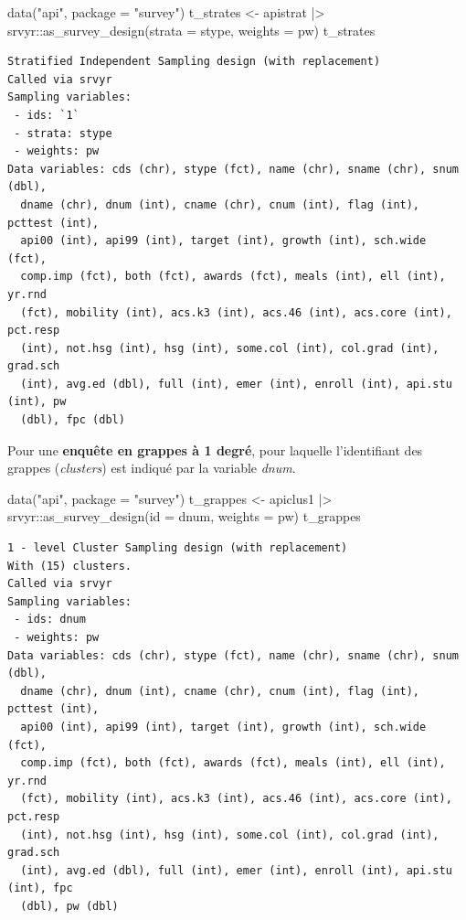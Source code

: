 \documentclass[
  letterpaper,
  DIV=11,
  numbers=noendperiod,
  oneside]{scrreprt}
\newenvironment{Shaded}{\begin{snugshade}}{\end{snugshade}}
\newcommand{\AttributeTok}[1]{\textcolor[rgb]{0.40,0.45,0.13}{#1}}
\newcommand{\FunctionTok}[1]{\textcolor[rgb]{0.28,0.35,0.67}{#1}}
\newcommand{\NormalTok}[1]{\textcolor[rgb]{0.00,0.23,0.31}{#1}}
\newcommand{\OtherTok}[1]{\textcolor[rgb]{0.00,0.23,0.31}{#1}}
\newcommand{\SpecialCharTok}[1]{\textcolor[rgb]{0.37,0.37,0.37}{#1}}
\newcommand{\StringTok}[1]{\textcolor[rgb]{0.13,0.47,0.30}{#1}}
\begin{document}
\begin{Shaded}
\begin{Highlighting}[]
\FunctionTok{data}\NormalTok{(}\StringTok{"api"}\NormalTok{, }\AttributeTok{package =} \StringTok{"survey"}\NormalTok{)}
\NormalTok{t\_strates }\OtherTok{\textless{}{-}}\NormalTok{ apistrat }\SpecialCharTok{|\textgreater{}} 
\NormalTok{  srvyr}\SpecialCharTok{::}\FunctionTok{as\_survey\_design}\NormalTok{(}\AttributeTok{strata =}\NormalTok{ stype, }\AttributeTok{weights =}\NormalTok{ pw)}
\NormalTok{t\_strates}
\end{Highlighting}
\end{Shaded}

\begin{verbatim}
Stratified Independent Sampling design (with replacement)
Called via srvyr
Sampling variables:
 - ids: `1`
 - strata: stype
 - weights: pw
Data variables: cds (chr), stype (fct), name (chr), sname (chr), snum (dbl),
  dname (chr), dnum (int), cname (chr), cnum (int), flag (int), pcttest (int),
  api00 (int), api99 (int), target (int), growth (int), sch.wide (fct),
  comp.imp (fct), both (fct), awards (fct), meals (int), ell (int), yr.rnd
  (fct), mobility (int), acs.k3 (int), acs.46 (int), acs.core (int), pct.resp
  (int), not.hsg (int), hsg (int), some.col (int), col.grad (int), grad.sch
  (int), avg.ed (dbl), full (int), emer (int), enroll (int), api.stu (int), pw
  (dbl), fpc (dbl)
\end{verbatim}

Pour une \textbf{enquête en grappes à 1 degré}, pour laquelle
l'identifiant des grappes (\emph{clusters}) est indiqué par la variable
\emph{dnum}.

\begin{Shaded}
\begin{Highlighting}[]
\FunctionTok{data}\NormalTok{(}\StringTok{"api"}\NormalTok{, }\AttributeTok{package =} \StringTok{"survey"}\NormalTok{)}
\NormalTok{t\_grappes }\OtherTok{\textless{}{-}}\NormalTok{ apiclus1 }\SpecialCharTok{|\textgreater{}} 
\NormalTok{    srvyr}\SpecialCharTok{::}\FunctionTok{as\_survey\_design}\NormalTok{(}\AttributeTok{id =}\NormalTok{ dnum, }\AttributeTok{weights =}\NormalTok{ pw)}
\NormalTok{t\_grappes}
\end{Highlighting}
\end{Shaded}

\begin{verbatim}
1 - level Cluster Sampling design (with replacement)
With (15) clusters.
Called via srvyr
Sampling variables:
 - ids: dnum
 - weights: pw
Data variables: cds (chr), stype (fct), name (chr), sname (chr), snum (dbl),
  dname (chr), dnum (int), cname (chr), cnum (int), flag (int), pcttest (int),
  api00 (int), api99 (int), target (int), growth (int), sch.wide (fct),
  comp.imp (fct), both (fct), awards (fct), meals (int), ell (int), yr.rnd
  (fct), mobility (int), acs.k3 (int), acs.46 (int), acs.core (int), pct.resp
  (int), not.hsg (int), hsg (int), some.col (int), col.grad (int), grad.sch
  (int), avg.ed (dbl), full (int), emer (int), enroll (int), api.stu (int), fpc
  (dbl), pw (dbl)
\end{verbatim}
\end{document}
